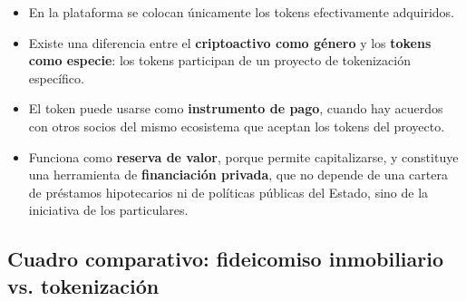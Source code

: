\documentclass[12pt,oneside]{book}
\begin{document}
\begin{itemize}
    \item En la plataforma se colocan únicamente los tokens efectivamente adquiridos.
    \item Existe una diferencia entre el \textbf{criptoactivo como género} y los \textbf{tokens como especie}: los tokens participan de un proyecto de tokenización específico.
    \item El token puede usarse como \textbf{instrumento de pago}, cuando hay acuerdos con otros socios del mismo ecosistema que aceptan los tokens del proyecto.
    \item Funciona como \textbf{reserva de valor}, porque permite capitalizarse, y constituye una herramienta de \textbf{financiación privada}, que no depende de una cartera de préstamos hipotecarios ni de políticas públicas del Estado, sino de la iniciativa de los particulares.
\end{itemize}

\subsection{Cuadro comparativo: fideicomiso inmobiliario vs. tokenización}
\end{document}
